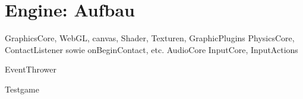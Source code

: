 \part{Engine: Aufbau}









GraphicsCore, WebGL, canvas, Shader, Texturen, GraphicPlugins
PhysicsCore, ContactListener sowie onBeginContact, etc.
AudioCore
InputCore, InputActions

EventThrower

Testgame